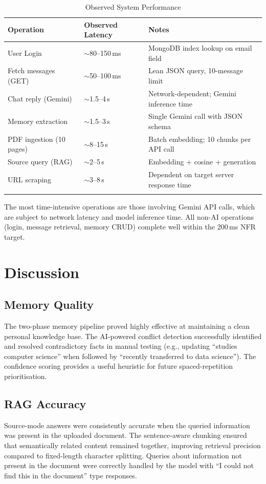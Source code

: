 \documentclass[12pt,a4paper]{report}
\begin{document}
\begin{longtable}{@{}p{4.5cm} p{3cm} p{5.5cm}@{}}
\toprule
\textbf{Operation} & \textbf{Observed Latency} & \textbf{Notes} \\
\midrule
\endhead
User Login & $\sim$80--150\,ms & MongoDB index lookup on email field \\
Fetch messages (GET) & $\sim$50--100\,ms & Lean JSON query, 10-message limit \\
Chat reply (Gemini) & $\sim$1.5--4\,s & Network-dependent; Gemini inference time \\
Memory extraction & $\sim$1.5--3\,s & Single Gemini call with JSON schema \\
PDF ingestion (10 pages) & $\sim$8--15\,s & Batch embedding; 10 chunks per API call \\
Source query (RAG) & $\sim$2--5\,s & Embedding + cosine + generation \\
URL scraping & $\sim$3--8\,s & Dependent on target server response time \\
\bottomrule
\caption{Observed System Performance}
\label{tab:perf}
\end{longtable}

The most time-intensive operations are those involving Gemini API calls, which are subject to network latency and model inference time. All non-AI operations (login, message retrieval, memory CRUD) complete well within the 200\,ms NFR target.

\section{Discussion}

\subsection{Memory Quality}
The two-phase memory pipeline proved highly effective at maintaining a clean personal knowledge base. The AI-powered conflict detection successfully identified and resolved contradictory facts in manual testing (e.g., updating ``studies computer science'' when followed by ``recently transferred to data science''). The confidence scoring provides a useful heuristic for future spaced-repetition prioritisation.

\subsection{RAG Accuracy}
Source-mode answers were consistently accurate when the queried information was present in the uploaded document. The sentence-aware chunking ensured that semantically related content remained together, improving retrieval precision compared to fixed-length character splitting. Queries about information not present in the document were correctly handled by the model with ``I could not find this in the document'' type responses.
\end{document}
